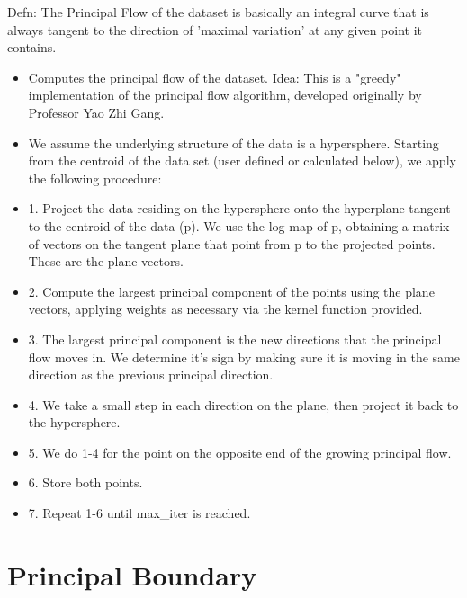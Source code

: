 \documentclass[12pt]{report}
\begin{document}
Defn: The Principal Flow of the dataset is basically an integral curve that is always tangent to the direction of 'maximal variation' at any given point it contains.
\begin{itemize}
    \item Computes the principal flow of the dataset. 
    Idea: This is a "greedy" implementation of the principal flow 
    algorithm, developed originally by Professor Yao Zhi Gang.
    
    \item We assume the underlying structure of the data is a hypersphere.
    Starting from the centroid of the data set (user defined or calculated below), we apply the following procedure: 
    \item 1. Project the data residing on the hypersphere onto the hyperplane
    tangent to the centroid of the data (p). We use the log map of p, 
    obtaining a matrix of vectors on the tangent plane that point from p
    to the projected points. These are the plane vectors.

    \item 2. Compute the largest principal component of the points using the plane vectors, applying weights as necessary via the kernel function provided.

    \item 3. The largest principal component is the new directions that the principal flow moves in. We determine it's sign by making sure it is moving in the same direction as the previous principal direction.

    \item 4. We take a small step in each direction on the plane,
    then project it back to the hypersphere.

    \item 5. We do 1-4 for the point on the opposite end of the growing principal flow.

    \item 6. Store both points. 
    
    \item 7. Repeat 1-6 until max\_iter is reached.
\end{itemize}

\chapter*{Principal Boundary}
\end{document}
